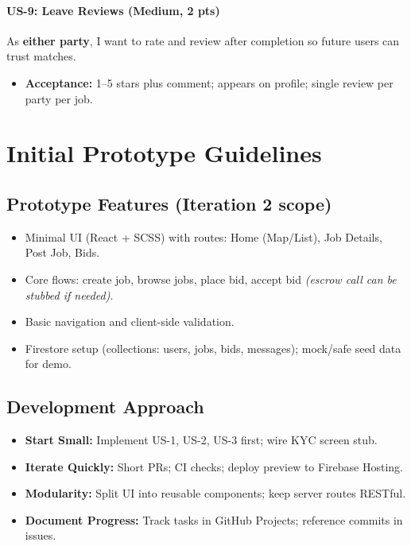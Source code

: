 \documentclass[11pt]{article}
\begin{document}
\paragraph{US-9: Leave Reviews (Medium, 2 pts)}
As \textbf{either party}, I want to rate and review after completion so future users can trust matches.
\begin{itemize}[leftmargin=1.4em]
  \item \textbf{Acceptance:} 1–5 stars plus comment; appears on profile; single review per party per job.
\end{itemize}

\section{Initial Prototype Guidelines}

\subsection{Prototype Features (Iteration 2 scope)}
\begin{itemize}[leftmargin=1.4em]
  \item Minimal UI (React + SCSS) with routes: Home (Map/List), Job Details, Post Job, Bids.
  \item Core flows: create job, browse jobs, place bid, accept bid \emph{(escrow call can be stubbed if needed)}.
  \item Basic navigation and client-side validation.
  \item Firestore setup (collections: users, jobs, bids, messages); mock/safe seed data for demo.
\end{itemize}

\subsection{Development Approach}
\begin{itemize}[leftmargin=1.4em]
  \item \textbf{Start Small:} Implement US-1, US-2, US-3 first; wire KYC screen stub.
  \item \textbf{Iterate Quickly:} Short PRs; CI checks; deploy preview to Firebase Hosting.
  \item \textbf{Modularity:} Split UI into reusable components; keep server routes RESTful.
  \item \textbf{Document Progress:} Track tasks in GitHub Projects; reference commits in issues.
\end{itemize}
\end{document}
